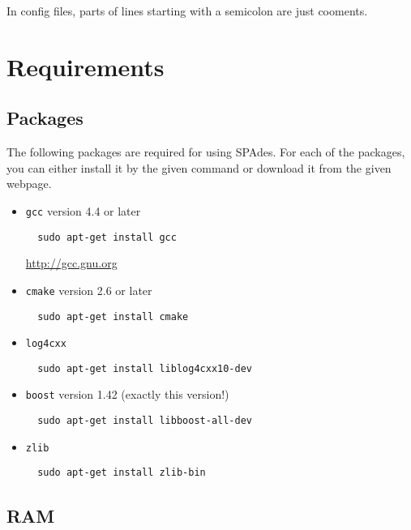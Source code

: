 \documentclass{article}
\def\spades{SPAdes}
\begin{document}
In config files, parts of lines starting with a semicolon are just cooments.


\section{Requirements}\label{section:requirements}
\subsection{Packages}
The following packages are required for using {\spades}.
For each of the packages, you can either install it by 
the given command or download it from the given webpage.{}

\begin{itemize}
  \item {\tt gcc} version 4.4 or later
  \begin{lstlisting}
  sudo apt-get install gcc
  \end{lstlisting}
  \url{http://gcc.gnu.org}

  \item {\tt cmake} version 2.6 or later
  \begin{lstlisting}
  sudo apt-get install cmake
  \end{lstlisting}

  \item {\tt log4cxx}
  \begin{lstlisting}
  sudo apt-get install liblog4cxx10-dev
  \end{lstlisting}

  \item {\tt boost} version 1.42 (exactly this version!)
  \begin{lstlisting}
  sudo apt-get install libboost-all-dev
  \end{lstlisting}

  \item {\tt zlib}
  \begin{lstlisting}
  sudo apt-get install zlib-bin
  \end{lstlisting}
\end{itemize}

\subsection{RAM}
\end{document}
